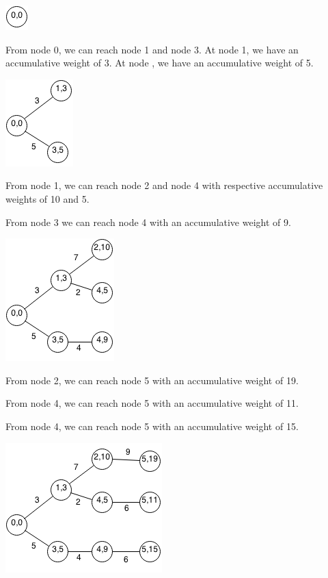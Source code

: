 \documentclass[11pt,oneside]{book}
\makeatletter
\def\maxwidth#1{\ifdim\Gin@nat@width>#1 #1\else\Gin@nat@width\fi}
\makeatother
\begin{document}
\includegraphics[width=\maxwidth{\textwidth}]{bellmanford2.png}

From node 0, we can reach node 1 and node 3. At node 1, we have an accumulative weight of 3. At node , we have an accumulative weight of 5.

\includegraphics[width=\maxwidth{\textwidth}]{bellmanford3.png}

From node 1, we can reach node 2 and node 4 with respective accumulative weights of 10 and 5.

From node 3 we can reach node 4 with an accumulative weight of 9.

\includegraphics[width=\maxwidth{\textwidth}]{bellmanford4.png}

From node 2, we can reach node 5 with an accumulative weight of 19.

From node 4, we can reach node 5 with an accumulative weight of 11.

From node 4, we can reach node 5 with an accumulative weight of 15.

\includegraphics[width=\maxwidth{\textwidth}]{bellmanford5.png}
\end{document}
